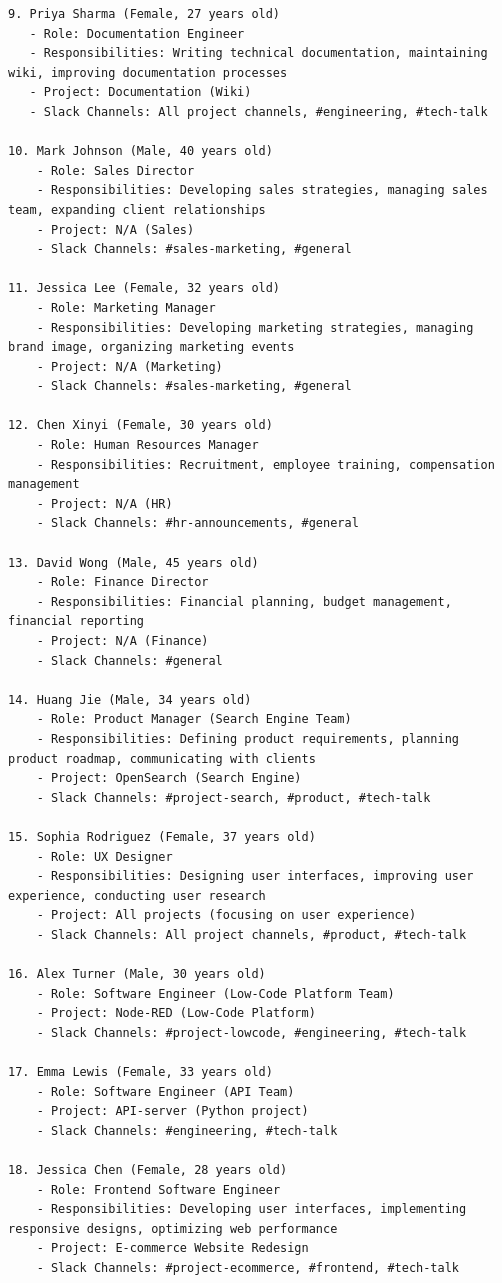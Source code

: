 \begin{lstlisting}
9. Priya Sharma (Female, 27 years old)
   - Role: Documentation Engineer
   - Responsibilities: Writing technical documentation, maintaining wiki, improving documentation processes
   - Project: Documentation (Wiki)
   - Slack Channels: All project channels, #engineering, #tech-talk

10. Mark Johnson (Male, 40 years old)
    - Role: Sales Director
    - Responsibilities: Developing sales strategies, managing sales team, expanding client relationships
    - Project: N/A (Sales)
    - Slack Channels: #sales-marketing, #general

11. Jessica Lee (Female, 32 years old)
    - Role: Marketing Manager
    - Responsibilities: Developing marketing strategies, managing brand image, organizing marketing events
    - Project: N/A (Marketing)
    - Slack Channels: #sales-marketing, #general

12. Chen Xinyi (Female, 30 years old)
    - Role: Human Resources Manager
    - Responsibilities: Recruitment, employee training, compensation management
    - Project: N/A (HR)
    - Slack Channels: #hr-announcements, #general

13. David Wong (Male, 45 years old)
    - Role: Finance Director
    - Responsibilities: Financial planning, budget management, financial reporting
    - Project: N/A (Finance)
    - Slack Channels: #general

14. Huang Jie (Male, 34 years old)
    - Role: Product Manager (Search Engine Team)
    - Responsibilities: Defining product requirements, planning product roadmap, communicating with clients
    - Project: OpenSearch (Search Engine)
    - Slack Channels: #project-search, #product, #tech-talk

15. Sophia Rodriguez (Female, 37 years old)
    - Role: UX Designer
    - Responsibilities: Designing user interfaces, improving user experience, conducting user research
    - Project: All projects (focusing on user experience)
    - Slack Channels: All project channels, #product, #tech-talk

16. Alex Turner (Male, 30 years old)
    - Role: Software Engineer (Low-Code Platform Team)
    - Project: Node-RED (Low-Code Platform)
    - Slack Channels: #project-lowcode, #engineering, #tech-talk

17. Emma Lewis (Female, 33 years old)
    - Role: Software Engineer (API Team)
    - Project: API-server (Python project)
    - Slack Channels: #engineering, #tech-talk

18. Jessica Chen (Female, 28 years old)
    - Role: Frontend Software Engineer
    - Responsibilities: Developing user interfaces, implementing responsive designs, optimizing web performance
    - Project: E-commerce Website Redesign
    - Slack Channels: #project-ecommerce, #frontend, #tech-talk
\end{lstlisting}

